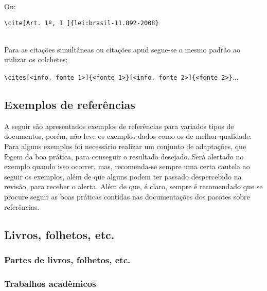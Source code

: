 Ou:

\verb|\cite[Art. 1º, I ]{lei:brasil-11.892-2008}|

\cite[Art. 1º, I ]{lei:brasil-11.892-2008}\\

Para as citações simultâneas ou citações apud segue-se o mesmo padrão ao utilizar os colchetes:

\verb|\cites[<info. fonte 1>]{<fonte 1>}[<info. fonte 2>]{<fonte 2>}|...

\subsection{Exemplos de referências}
A seguir são apresentados exemplos de referências para variados tipos de documentos, porém, não leve os exemplos dados como os de melhor qualidade. Para alguns exemplos foi necessário realizar um conjunto de adaptações, que fogem da boa prática, para conseguir o resultado desejado. Será alertado no exemplo quando isso ocorrer, mas, recomenda-se sempre uma certa cautela ao seguir os exemplos, além de que alguns podem ter passado despercebido na revisão, para receber o alerta. Além de que, é claro, sempre é recomendado que se procure seguir as boas práticas contidas nas documentações dos pacotes sobre referências.

\subsection{Livros, folhetos, etc.}






\subsubsection{Partes de livros, folhetos, etc.}



\subsubsection{Trabalhos acadêmicos}

